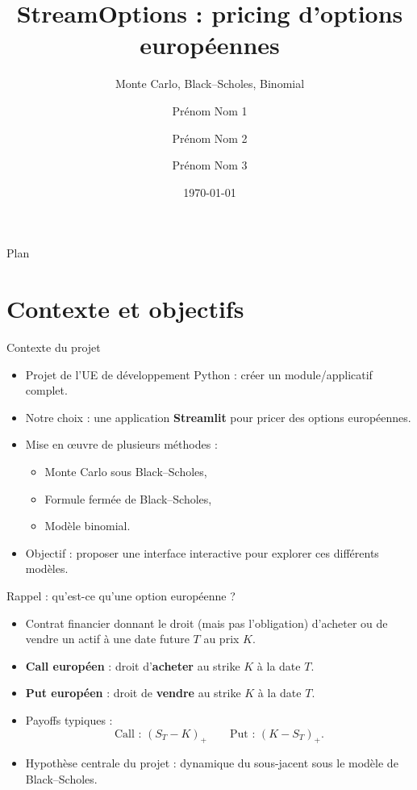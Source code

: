 \documentclass[aspectratio=169]{beamer}
\title{StreamOptions : pricing d'options europ\'eennes}
\subtitle{Monte Carlo, Black--Scholes, Binomial}
\author{Prénom Nom 1 \and Prénom Nom 2 \and Prénom Nom 3}
\institute{M1 Statistique et Science des Donn\'ees -- Universit\'e de Montpellier}
\date{\today}
\begin{document}
\begin{frame}
  \titlepage
\end{frame}

\begin{frame}{Plan}
  \tableofcontents
\end{frame}

\section{Contexte et objectifs}

\begin{frame}{Contexte du projet}
  \begin{itemize}
    \item Projet de l'UE de d\'eveloppement Python : cr\'eer un module/applicatif complet.
    \item Notre choix : une application \textbf{Streamlit} pour pricer des options europ\'eennes.
    \item Mise en \oe uvre de plusieurs m\'ethodes :
    \begin{itemize}
      \item Monte Carlo sous Black--Scholes,
      \item Formule ferm\'ee de Black--Scholes,
      \item Mod\`ele binomial.
    \end{itemize}
    \item Objectif : proposer une interface interactive pour explorer ces diff\'erents mod\`eles.
  \end{itemize}
\end{frame}

\begin{frame}{Rappel : qu'est-ce qu'une option europ\'eenne ?}
  \begin{itemize}
    \item Contrat financier donnant le droit (mais pas l'obligation) d'acheter ou de vendre un actif \`a une date future $T$ au prix $K$.
    \item \textbf{Call europ\'een} : droit d'\textbf{acheter} au strike $K$ \`a la date $T$.
    \item \textbf{Put europ\'een} : droit de \textbf{vendre} au strike $K$ \`a la date $T$.
    \item Payoffs typiques :
    \[
      \text{Call : } (S_T - K)_+ \qquad
      \text{Put : } (K - S_T)_+.
    \]
    \item Hypoth\`ese centrale du projet : dynamique du sous-jacent sous le mod\`ele de Black--Scholes.
  \end{itemize}
\end{frame}
\end{document}

